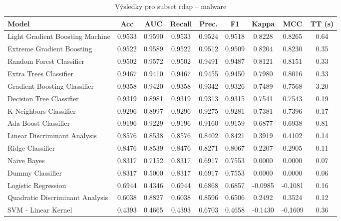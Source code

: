 \begin{table}[H]
  \centering
  \small
  \caption{Výsledky pro subset rdap – malware}
  \begin{tabular}{|l|c|c|c|c|c|c|c|c|}
    \hline
    \textbf{Model} & \textbf{Acc} & \textbf{AUC} & \textbf{Recall} & \textbf{Prec.} & \textbf{F1} & \textbf{Kappa} & \textbf{MCC} & \textbf{TT (s)} \\
    \hline
    Light Gradient Boosting Machine & 0.9533 & 0.9590 & 0.9533 & 0.9524 & 0.9518 & 0.8228 & 0.8265 & 0.64 \\
    Extreme Gradient Boosting & 0.9522 & 0.9589 & 0.9522 & 0.9512 & 0.9509 & 0.8204 & 0.8230 & 0.35 \\
    Random Forest Classifier & 0.9502 & 0.9572 & 0.9502 & 0.9491 & 0.9487 & 0.8121 & 0.8151 & 0.33 \\
    Extra Trees Classifier & 0.9467 & 0.9410 & 0.9467 & 0.9455 & 0.9450 & 0.7980 & 0.8016 & 0.33 \\
    Gradient Boosting Classifier & 0.9358 & 0.9420 & 0.9358 & 0.9342 & 0.9326 & 0.7489 & 0.7568 & 3.20 \\
    Decision Tree Classifier & 0.9319 & 0.8981 & 0.9319 & 0.9313 & 0.9315 & 0.7541 & 0.7543 & 0.19 \\
    K Neighbors Classifier & 0.9296 & 0.8997 & 0.9296 & 0.9275 & 0.9281 & 0.7381 & 0.7396 & 0.17 \\
    Ada Boost Classifier & 0.9196 & 0.9229 & 0.9196 & 0.9160 & 0.9159 & 0.6877 & 0.6938 & 0.81 \\
    Linear Discriminant Analysis & 0.8576 & 0.8538 & 0.8576 & 0.8402 & 0.8421 & 0.3919 & 0.4102 & 0.14 \\
    Ridge Classifier & 0.8476 & 0.8539 & 0.8476 & 0.8271 & 0.8067 & 0.2207 & 0.2905 & 0.11 \\
    Naive Bayes & 0.8317 & 0.7152 & 0.8317 & 0.6917 & 0.7553 & 0.0000 & 0.0000 & 0.07 \\
    Dummy Classifier & 0.8317 & 0.5000 & 0.8317 & 0.6917 & 0.7553 & 0.0000 & 0.0000 & 0.06 \\
    Logistic Regression & 0.6944 & 0.4346 & 0.6944 & 0.6868 & 0.6857 & -0.0985 & -0.1081 & 0.16 \\
    Quadratic Discriminant Analysis & 0.6038 & 0.8827 & 0.6038 & 0.8596 & 0.6506 & 0.2492 & 0.3524 & 0.12 \\
    SVM - Linear Kernel & 0.4393 & 0.4665 & 0.4393 & 0.6703 & 0.4658 & -0.1430 & -0.1609 & 0.36 \\
    \hline
  \end{tabular}
\end{table}
\vspace{0.5cm}

